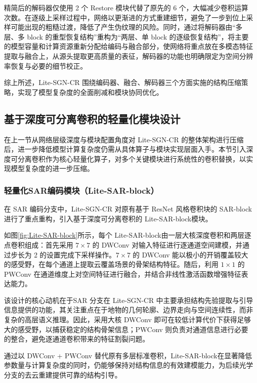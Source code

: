 精简后的解码器仅使用 2 个 Restore 模块代替了原先的 6 个，大幅减少卷积运算次数。在逐级上采样过程中，网络以更渐进的方式重建细节，避免了一步到位上采样可能出现的粗糙过渡，降低了产生伪纹理的风险。同时，通过将解码器由“多层、多 block 的重型恢复结构”重构为“两层、单 block 的逐级恢复结构”，将主要的模型容量和计算资源重新分配给编码与融合部分，使网络将重点放在多模态特征提取与融合上，从源头提取更高质量的表征，解码器的功能也明确限定为空间分辨率恢复与必要的细节校正。

综上所述，Lite-SGN-CR 围绕编码器、融合、解码器三个方面实施的结构压缩策略，实现了模型复杂度的全面削减和模块协同优化。

\subsection{基于深度可分离卷积的轻量化模块设计}

在上一节从网络层级深度与模块配置角度对 Lite-SGN-CR 的整体架构进行压缩后，进一步降低模型计算复杂度仍需从具体算子与模块实现层面入手。本节引入深度可分离卷积作为核心轻量化算子，对多个关键模块进行系统性的卷积替换，以实现模型复杂度的进一步压缩。

\subsubsection{轻量化SAR编码模块（Lite-SAR-block）}

在 SAR 编码分支中，Lite-SGN-CR 对原有基于 ResNet 风格卷积块的 SAR-block 进行了重点重构，引入基于深度可分离卷积的 Lite-SAR-block模块。

如图\ref{fig:Lite-SAR-block}所示，每个 Lite-SAR-block由一层大核深度卷积和两层逐点卷积组成：首先采用 $7\times7$ 的 DWConv 对输入特征进行逐通道空间建模，并通过步长为 2 的设置完成下采样操作。$7 \times 7$ 的 DWConv 能以极小的开销覆盖较大的感受野，在每个通道上提取云覆盖场景的骨架结构特征。随后，利用 $1\times1$ 的 PWConv 在通道维度上对空间特征进行融合，并结合非线性激活函数增强特征表达能力。

该设计的核心动机在于SAR 分支在 Lite-SGN-CR 中主要承担结构先验提取与引导信息提供的功能，其关注重点在于地物的几何轮廓、边界走向与空间连续性，而非复杂的高层语义推理。因此，采用大核 DWConv 即可在较低计算代价下获得足够大的感受野，以捕获稳定的结构骨架信息；PWConv 则负责对通道信息进行必要的整合，避免逐通道卷积带来的特征割裂问题。

通过以 DWConv + PWConv 替代原有多层标准卷积，Lite-SAR-block在显著降低参数量与计算复杂度的同时，仍能够保持对结构信息的有效建模能力，为后续光学分支的去云重建提供可靠的结构引导。

